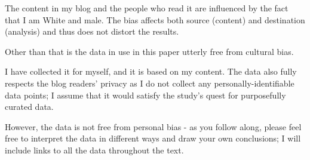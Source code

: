 The content in my blog and the people who read it are influenced by the fact that I am White and male. The bias affects both source (content) and destination (analysis) and thus does not distort the results.

Other than that is the data in use in this paper utterly free from cultural bias. 

I have collected it for myself, and it is based on my content. The data also fully respects the blog readers' privacy as I do not collect any personally-identifiable data points; I assume that it would satisfy the study's quest for purposefully curated data.

However, the data is not free from personal bias - as you follow along, please feel free to interpret the data in different ways and draw your own conclusions; I will include links to all the data throughout the text.
